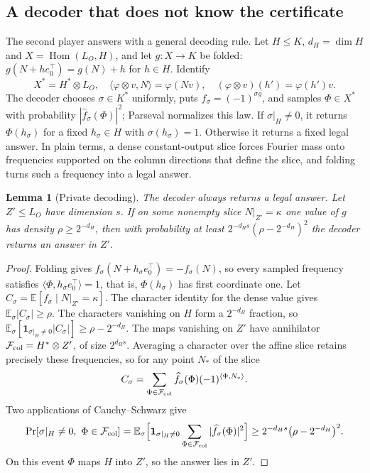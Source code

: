 \documentclass[11pt]{article}
\newtheorem{lemma}[theorem]{Lemma}
\newcommand{\E}{\mathbb E}
\newcommand{\Hom}{\operatorname{Hom}}
\newcommand{\ind}{\mathbf 1}
\begin{document}
\subsection{A decoder that does not know the certificate}

The second player answers with a general decoding rule. Let $H\le K$,
$d_H=\dim H$ and $X=\Hom(L_O,H)$, and let $g:X\to K$ be folded:
$g(N+he_0^\top)=g(N)+h$ for $h\in H$. Identify
\[
 X^*=H^*\otimes L_O,\quad
 \langle\varphi\otimes v,N\rangle=\varphi(Nv),\quad
 (\varphi\otimes v)(h')=\varphi(h')v.
\]
The decoder chooses $\sigma\in K^*$ uniformly, puts
$f_\sigma=(-1)^{\sigma g}$, and samples $\Phi\in X^*$ with probability
$|\widehat f_\sigma(\Phi)|^2$; Parseval normalizes this law. If
$\sigma|_H\ne0$, it returns $\Phi(h_\sigma)$ for a fixed $h_\sigma\in H$ with
$\sigma(h_\sigma)=1$. Otherwise it returns a fixed legal answer.
In plain terms, a dense constant-output slice forces Fourier mass onto
frequencies supported on the column directions that define the slice,
and folding turns such a frequency into a legal answer.

\begin{lemma}[Private decoding]\label{lem:decode}
The decoder always returns a legal answer. Let $Z'\le L_O$ have dimension
$s$. If on some nonempty slice $N|_{Z'}=\kappa$ one value of $g$ has density
$\rho\ge2^{-d_H}$, then with probability at least
$2^{-d_Hs}(\rho-2^{-d_H})^2$ the decoder returns an answer in $Z'$.
\end{lemma}

\begin{proof}
Folding gives $f_\sigma(N+h_\sigma e_0^\top)=-f_\sigma(N)$, so every
sampled frequency satisfies $\langle\Phi,h_\sigma e_0^\top\rangle=1$, that
is, $\Phi(h_\sigma)$ has first coordinate one. Let
$C_\sigma=\E[f_\sigma\mid N|_{Z'}=\kappa]$. The character identity for the
dense value gives $\E_\sigma|C_\sigma|\ge\rho$. The characters vanishing on
$H$ form a $2^{-d_H}$ fraction, so
$\E_\sigma[\ind_{\sigma|_H\ne0}|C_\sigma|]\ge\rho-2^{-d_H}$. The maps
vanishing on $Z'$ have annihilator $\mathcal F_{\rm col}=H^*\otimes Z'$, of
size $2^{d_Hs}$. Averaging a character over the affine slice retains
precisely these frequencies, so for any point $N_*$ of the slice
\[
 C_\sigma=\sum_{\Phi\in\mathcal F_{\rm col}}\widehat f_\sigma(\Phi)
                (-1)^{\langle\Phi,N_*\rangle}.
\]
Two applications of Cauchy--Schwarz give
\[
 \Pr[\sigma|_H\ne0,\ \Phi\in\mathcal F_{\rm col}]
 =\E_\sigma\Bigl[\ind_{\sigma|_H\ne0}
   \sum_{\Phi\in\mathcal F_{\rm col}}|\widehat f_\sigma(\Phi)|^2\Bigr]
 \ge2^{-d_Hs}\bigl(\rho-2^{-d_H}\bigr)^2.
\]
On this event $\Phi$ maps $H$ into $Z'$, so the answer lies in $Z'$.
\end{proof}
\end{document}
